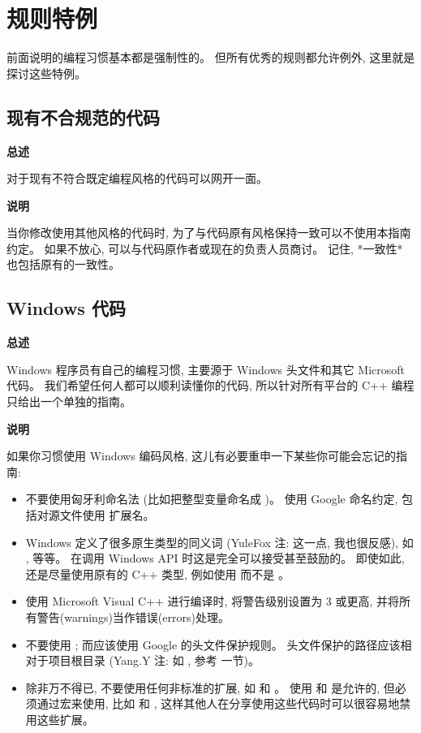 \chapter{规则特例}

前面说明的编程习惯基本都是强制性的。 但所有优秀的规则都允许例外, 这里就是探讨这些特例。

\section{现有不合规范的代码}

\textbf{总述}

对于现有不符合既定编程风格的代码可以网开一面。

\textbf{说明}

当你修改使用其他风格的代码时, 为了与代码原有风格保持一致可以不使用本指南约定。 如果不放心, 可以与代码原作者或现在的负责人员商讨。 记住, *一致性* 也包括原有的一致性。

\section{Windows 代码} \label{windows-code}

\textbf{总述}

Windows 程序员有自己的编程习惯, 主要源于 Windows 头文件和其它 Microsoft 代码。 我们希望任何人都可以顺利读懂你的代码, 所以针对所有平台的 C++ 编程只给出一个单独的指南。

\textbf{说明}

如果你习惯使用 Windows 编码风格, 这儿有必要重申一下某些你可能会忘记的指南:

\begin{itemize}
  \item  不要使用匈牙利命名法 (比如把整型变量命名成 )。 使用 Google 命名约定, 包括对源文件使用  扩展名。
  \item Windows 定义了很多原生类型的同义词 (YuleFox 注: 这一点, 我也很反感), 如 ,  等等。 在调用 Windows API 时这是完全可以接受甚至鼓励的。 即使如此, 还是尽量使用原有的 C++ 类型, 例如使用  而不是 。
  \item 使用 Microsoft Visual C++ 进行编译时, 将警告级别设置为 3 或更高, 并将所有警告(warnings)当作错误(errors)处理。
  \item 不要使用 ; 而应该使用 Google 的头文件保护规则。 头文件保护的路径应该相对于项目根目录 (Yang.Y 注: 如 , 参考  一节)。
  \item 除非万不得已, 不要使用任何非标准的扩展, 如  和 。 使用  和  是允许的, 但必须通过宏来使用, 比如  和 , 这样其他人在分享使用这些代码时可以很容易地禁用这些扩展。
\end{itemize}

